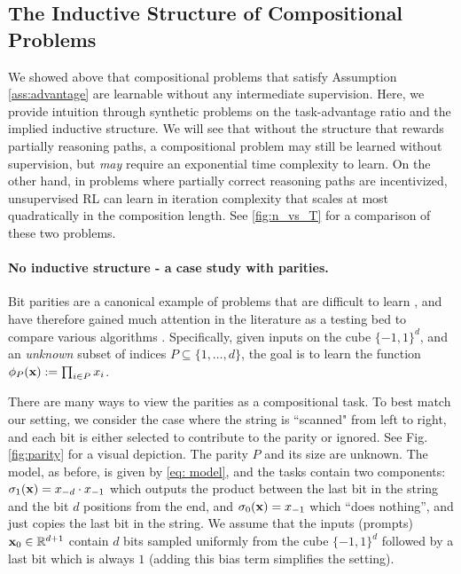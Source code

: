 \documentclass{article}
\theoremstyle{plain}
\theoremstyle{definition}
\theoremstyle{remark}
\begin{document}
\subsection{The Inductive Structure of Compositional Problems}\label{subsec:inductive_structure}

We showed above that compositional problems that satisfy Assumption \ref{ass:advantage} are learnable without any intermediate supervision. 
Here, we provide intuition through synthetic problems on the task-advantage ratio and the implied inductive structure. 
We will see that without the structure that rewards partially reasoning paths, a compositional problem may still be learned without supervision, but \textit{may} require an exponential time complexity to learn. On the other hand, in problems where partially correct reasoning paths are incentivized, unsupervised RL can learn in iteration complexity that scales at most quadratically in the composition length. See \cref{fig:n_vs_T} for a comparison of these two problems.

\paragraph{No inductive structure - a case study with parities.} 
Bit parities are a canonical example of problems that are difficult to learn \citep{blum1994weakly, kearns1998efficient, abbe2022non, shoshani2025hardness}, and have therefore gained much attention in the literature as a testing bed to compare various algorithms \citep{barak2022hidden, kim2024transformers, wen2024sparse, kou2024matching, abedsoltan2025task}.
Specifically, given inputs on the cube $\{-1, 1\}^d$, and an \emph{unknown} subset of indices $P\subseteq \{1,\ldots, d\}$, the goal is to learn the function $\phi_P(\mathbf{x}) := \prod_{i\in P} x_i$. 

There are many ways to view the parities as a compositional task. To best match our setting, we consider the case where the string is ``scanned" from left to right, and each bit is either selected to contribute to the parity or ignored. See Fig. \ref{fig:parity} for a visual depiction. The parity $P$ and its size are unknown. The model, as before, is given by \eqref{eq: model}, and the tasks contain two components: $\sigma_1(\mathbf{x})=x_{-d}\cdot x_{-1}$ which outputs the product between the last bit in the string and the bit $d$ positions from the end, and $\sigma_0(\mathbf{x})=  x_{-1}$ which ``does nothing'', and just copies the last bit in the string. We assume that the inputs (prompts) $\mathbf{x}_0 \in \mathbb{R}^{d+1}$ contain $d$ bits sampled uniformly from the cube $\{-1, 1\}^d$ followed by a last bit which is always $1$ (adding this bias term simplifies the setting). 
\end{document}

